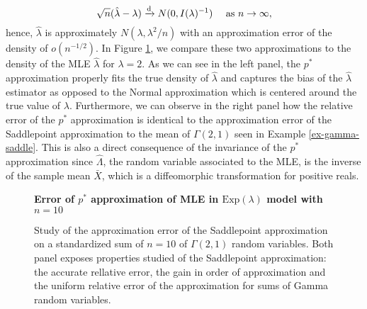 \begin{example}
    \begin{equation*}
        \sqrt{n}(\hat\lambda - \lambda) \xrightarrow[]{\text{d}} N(0, I(\lambda)^{-1})\ \ \ \  \text{as } n \rightarrow \infty,
    \end{equation*}
    hence, $\hat\lambda$ is approximately $N(\lambda, \lambda^2/n)$ with an approximation error of the density of $o(n^{-1/2})$. In Figure \ref{fig-pstar-approx}, we compare these two approximations to the density of the MLE $\hat\lambda$ for $\lambda = 2$. As we can see in the left panel, the $p^*$ approximation properly fits the true density of $\hat\lambda$ and captures the bias of the $\hat\lambda$ estimator as opposed to the Normal approximation which is centered around the true value of $\lambda$. Furthermore, we can observe in the right panel how the relative error of the $p^*$ approximation is identical to the approximation error of the Saddlepoint approximation to the mean of $\Gamma(2, 1)$ seen in Example \ref{ex-gamma-saddle}. This is also a direct consequence of the invariance of the $p^*$ approximation since $\hat\Lambda$, the random variable associated to the MLE, is the inverse of the sample mean $\bar X$, which is a diffeomorphic transformation for positive reals.
    
    \begin{figure}
        \textbf{Error of $p^*$ approximation of MLE in $\textrm{Exp}(\lambda)$ model with $n=10$}
        \centering
        \caption{Study of the approximation error of the Saddlepoint approximation on a standardized sum of $n=10$ of $\Gamma(2, 1)$ random variables. Both panel exposes properties studied of the Saddlepoint approximation: the accurate rellative error, the gain in order of approximation and the uniform relative error of the approximation for sums of Gamma random variables.}
        \label{fig-pstar-approx}
    \end{figure}    

    

    

\end{example}
